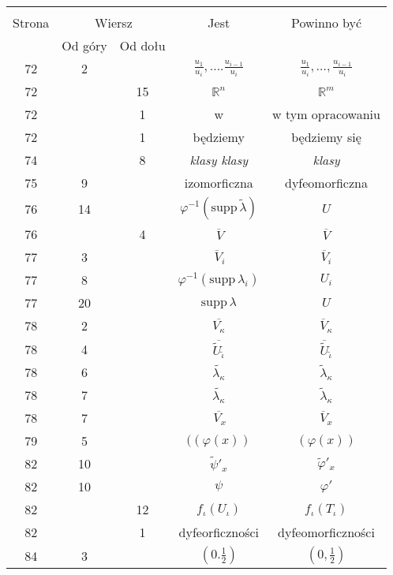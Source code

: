 \documentclass[a4paper,11pt]{article}
\newcommand{\fr}{\frac}
\newcommand{\mb}{\mathbb}
\newcommand{\mr}{\mathrm}
\newcommand{\ol}{\overline}
\newcommand{\ld}{\ldots}
\newcommand{\supp}{\mr{supp}}
\newcommand{\vp}{\varphi}
\newcommand{\io}{\iota}
\newcommand{\ka}{\kappa}
\newcommand{\la}{\lambda}
\newcommand{\R}{\mb{R}}
\newcommand{\wt}{\widetilde}
\begin{document}
\begin{center}
  \begin{tabular}{|c|c|c|c|c|}
    \hline
    & \multicolumn{2}{c|}{} & & \\
    Strona & \multicolumn{2}{c|}{Wiersz} & Jest
                              & Powinno być \\ \cline{2-3}
    & Od góry & Od dołu &  &  \\
    \hline
    72 &  2 & & $\fr{ u_{ 1 } }{ u_{ i } },
                \ld. \fr{ u_{ i - 1 } }{ u_{ i } }$
           & $\fr{ u_{ 1 } }{ u_{ i } }, \ld,
             \fr{ u_{ i - 1 } }{ u_{ i } }$ \\
    72 & & 15 & $\R^{ n }$ & $\R^{ m }$ \\
    72 & &  1 & w & w tym opracowaniu \\
    72 & &  1 & będziemy & będziemy się \\
    74 & &  8 & \emph{klasy klasy} & \emph{klasy} \\
    75 &  9 & & izomorficzna & dyfeomorficzna \\
    76 & 14 & & $\vp^{ -1 }( \supp \, \wt{ \la } )$ & $U$ \\
    76 & &  4 & $\ol{ \, V }$ & $\ol{ V }$ \\
    77 &  3 & & $\ol{\, V}_{ i }$ & $\ol{ V }_{ i }$ \\
    77 &  8 & & $\vp^{ -1 }( \supp \, \la_{ i } )$ & $U_{ i }$ \\
    77 & 20 & & $\supp \, \la$ & $U$ \\
    78 &  2 & & $\ol{ V_{ \ka } }$ & $\ol{ V }_{ \ka }$ \\
    78 &  4 & & $\ol{ \wt{ U }_{ \tilde{ \io } } }$
           & $\ol{ \wt{ U } }_{ \tilde{ \io } }$ \\
    78 &  6 & & $\wt{ \la_{ \ka } }$
           & $\wt{ \la }_{ \ka }$ \\
    78 &  7 & & $\wt{ \la_{ \ka } }$
           & $\wt{ \la }_{ \ka }$ \\
    78 &  7 & & $\ol{ \, V_{ x } }$ & $\ol{ V }_{ x }$ \\
    79 &  5 & & $( ( \vp( x ) )$ & $( \vp( x ) )$ \\
    82 & 10 & & $\wt{ \psi }'_{ x }$
           & $\wt{ \vp }'_{ x }$ \\
    82 & 10 & & $\psi$ & $\vp'$ \\
    82 & & 12 & $f_{ \io }( U_{ \io } )$ & $f_{ \io }( T_{ \io } )$ \\
    82 & &  1 & dyfeorficzności & dyfeomorficzności \\
    84 &  3 & & $( 0. \fr{ 1 }{ 2 } )$ & $( 0, \fr{ 1 }{ 2 } )$ \\

\end{tabular}
\end{center}
\end{document}
